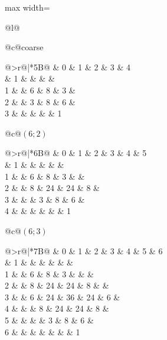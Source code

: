 \documentclass[11pt,reqno]{amsart}
\makeatletter
\theoremstyle{remark}
\newcommand{\z}{\textendash}               %
\newcommand{\h}[1]{{\scriptsize #1}}       %
\newenvironment{betti}[1]
  {\begingroup\setlength{\tabcolsep}{1.5pt}%
   \renewcommand{\arraystretch}{1.15}%
   \begin{tabular}[t]{@{}>{\scriptsize}r@{\hspace{5pt}}|*{#1}{B}@{}}}
  {\end{tabular}\endgroup}
\newcommand{\bettipanel}[2]{%
  \begin{tabular}[t]{@{}c@{}}\small #1\\[3pt] #2\end{tabular}}
\makeatother
\begin{document}
\begin{figure}
\centering
\begin{adjustbox}{max width=\linewidth}
\begin{tabular}{@{}l@{}}

\bettipanel{coarse}{%
\begin{betti}{5}
  & \h0 & \h1 & \h2 & \h3 & \h4 \\ \hline
0 & 1  & \z & \z & \z & \z \\
1 & \z & 6  & 8  & 3  & \z \\
2 & \z & 3  & 8  & 6  & \z \\
3 & \z & \z & \z & \z & 1
\end{betti}}%
\hspace{2.2em}%
\bettipanel{$(6;2)$}{%
\begin{betti}{6}
  & \h0 & \h1 & \h2 & \h3 & \h4 & \h5 \\ \hline
0 & 1  & \z & \z & \z & \z & \z \\
1 & \z & 6  & 8  & 3  & \z & \z \\
2 & \z & 8  & 24 & 24 & 8  & \z \\
3 & \z & \z & 3  & 8  & 6  & \z \\
4 & \z & \z & \z & \z & \z & 1
\end{betti}}%
\hspace{2.2em}%
\bettipanel{$(6;3)$}{%
\begin{betti}{7}
  & \h0 & \h1 & \h2 & \h3 & \h4 & \h5 & \h6 \\ \hline
0 & 1  & \z & \z & \z & \z & \z & \z \\
1 & \z & 6  & 8  & 3  & \z & \z & \z \\
2 & \z & 8  & 24 & 24 & 8  & \z & \z \\
3 & \z & 6  & 24 & 36 & 24 & 6  & \z \\
4 & \z & \z & 8  & 24 & 24 & 8  & \z \\
5 & \z & \z & \z & 3  & 8  & 6  & \z \\
6 & \z & \z & \z & \z & \z & \z & 1
\end{betti}}
%

\end{tabular}
\end{adjustbox}
\end{figure}
\end{document}
